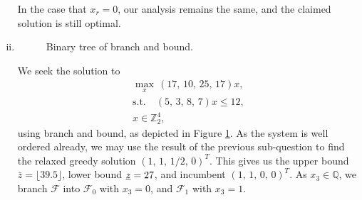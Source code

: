 \documentclass[11pt,a4paper]{article}
\begin{document}
\begin{enumerate}[i)]
	In the case that $x_r = 0$, our analysis remains the same, and the claimed solution is still optimal.
	\item
	\begin{figure}[tbp]
		\centering
		\caption{Binary tree of branch and bound.}
		\label{fig:bnb}
	\end{figure}
	We seek the solution to
	\begin{gather*}
		\max_x \, (17, \, 10, \, 25, \, 17) x, \\
		\text{s.t.} \quad (5, \, 3, \, 8, \, 7) x \leq 12, \\
		x \in \mathbb{Z}_2^4,
	\end{gather*}
	using branch and bound, as depicted in Figure \ref{fig:bnb}. As the system is well ordered already, we may use the result of the previous sub-question to find the relaxed greedy solution $(1, \, 1, \, 1/2, \, 0)^T$. This gives us the upper bound $\bar{z} = \lfloor 39.5 \rfloor$, lower bound $\underbar{$z$} = 27$, and incumbent $(1, \, 1, \, 0, \, 0)^T$. As $x_3 \in \mathbb{Q}$, we branch $\mathcal{F}$ into $\mathcal{F}_0$ with $x_3 = 0$, and $\mathcal{F}_1$ with $x_3 = 1$.


\end{enumerate}
\end{document}
